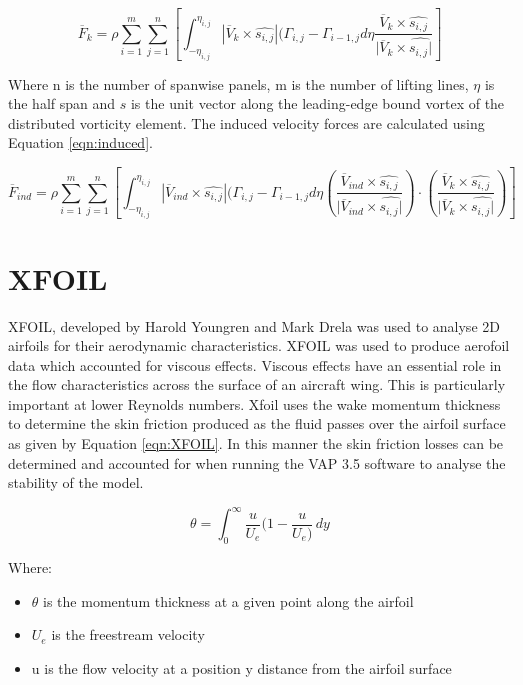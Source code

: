 \begin{equation}
\overline{F}_k = \rho \sum_{i=1}^{m} \sum_{j=1}^{n} \left[ \int_{-\eta_{i,j}}^{\eta_{i,j}} |\overline{V}_k \times  \hat{s_{i,j}} | (\Gamma_{i,j} - \Gamma_{i-1,j}d\eta \frac{ \overline{V}_k \times \hat{s_{i,j}} }{|\overline{V}_k \times \hat{s_{i,j}|}} \right]
\label{eqn:kinematic}
\end{equation}

Where n is the number of spanwise panels, m is the number of lifting lines, $\eta$ is the half span and $\hat{s}$ is the unit vector along the leading-edge bound vortex of the distributed vorticity element. The induced velocity forces are calculated using Equation \ref{eqn:induced}.

\begin{equation}
\overline{F}_{ind} = \rho \sum_{i=1}^{m} \sum_{j=1}^{n} \left[ \int_{-\eta_{i,j}}^{\eta_{i,j}} |\overline{V}_{ind} \times  \hat{s_{i,j}} | (\Gamma_{i,j} - \Gamma_{i-1,j}d\eta \left(\frac{ \overline{V}_{ind} \times \hat{s_{i,j}} }{|\overline{V}_{ind} \times \hat{s_{i,j}|}}\right) \cdot \left(\frac{ \overline{V}_k \times \hat{s_{i,j}} }{|\overline{V}_k \times \hat{s_{i,j}|}}\right) \right]
\label{eqn:induced}
\end{equation}






\section{XFOIL}
XFOIL, developed by Harold Youngren and Mark Drela was used to analyse 2D airfoils for their aerodynamic characteristics. XFOIL was used to produce aerofoil data which accounted for viscous effects.  Viscous effects have an essential role in the flow characteristics across the surface of an aircraft wing. This is particularly important at lower Reynolds numbers. Xfoil uses the wake momentum thickness to determine the skin friction produced as the fluid passes over the airfoil surface as given by Equation \ref{eqn:XFOIL}. In this manner the skin friction losses can be determined and accounted for when running the VAP 3.5 software to analyse the stability of the model. 



\begin{equation}
    \theta = \int_{0}^{\infty} \frac{u}{U_e} ( 1 - \frac{u}{U_e) } \,dy
    \label{eqn:XFOIL}
\end{equation}

Where:
\begin{itemize}
    \item $\theta$ is the momentum thickness at a given point along the airfoil
    \item $U_e$ is the freestream velocity 
    \item u is the flow velocity at a position y distance from the airfoil surface
\end{itemize}


